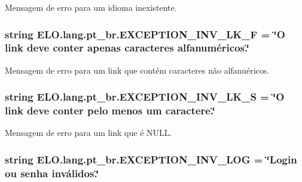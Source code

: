 Mensagem de erro para um idioma inexistente. 

\hypertarget{namespaceELO_1_1lang_1_1pt__br_ac80c2fa8182d4fcfd98a0aa7ee2fc242}{
\subsubsection[{E\-X\-C\-E\-P\-T\-I\-O\-N\-\_\-\-I\-N\-V\-\_\-\-L\-K\-\_\-\-F}]{\setlength{\rightskip}{0pt plus 5cm}string E\-L\-O.\-lang.\-pt\-\_\-br.\-E\-X\-C\-E\-P\-T\-I\-O\-N\-\_\-\-I\-N\-V\-\_\-\-L\-K\-\_\-\-F = \char`\"{}O link deve conter apenas caracteres alfanuméricos.\char`\"{}}}\label{d5/d70/namespaceELO_1_1lang_1_1pt__br_ac80c2fa8182d4fcfd98a0aa7ee2fc242}


Mensagem de erro para um link que contém caracteres não alfanuéricos. 

\hypertarget{namespaceELO_1_1lang_1_1pt__br_ab858646bddd566c0593f3787997a459c}{
\subsubsection[{E\-X\-C\-E\-P\-T\-I\-O\-N\-\_\-\-I\-N\-V\-\_\-\-L\-K\-\_\-\-S}]{\setlength{\rightskip}{0pt plus 5cm}string E\-L\-O.\-lang.\-pt\-\_\-br.\-E\-X\-C\-E\-P\-T\-I\-O\-N\-\_\-\-I\-N\-V\-\_\-\-L\-K\-\_\-\-S = \char`\"{}O link deve conter pelo menos um caractere.\char`\"{}}}\label{d5/d70/namespaceELO_1_1lang_1_1pt__br_ab858646bddd566c0593f3787997a459c}


Mensagem de erro para um link que é N\-U\-L\-L. 

\hypertarget{namespaceELO_1_1lang_1_1pt__br_a5b035d65858f7603a39f3e86362ef997}{
\subsubsection[{E\-X\-C\-E\-P\-T\-I\-O\-N\-\_\-\-I\-N\-V\-\_\-\-L\-O\-G}]{\setlength{\rightskip}{0pt plus 5cm}string E\-L\-O.\-lang.\-pt\-\_\-br.\-E\-X\-C\-E\-P\-T\-I\-O\-N\-\_\-\-I\-N\-V\-\_\-\-L\-O\-G = \char`\"{}Login ou senha inválidos.\char`\"{}}}\label{d5/d70/namespaceELO_1_1lang_1_1pt__br_a5b035d65858f7603a39f3e86362ef997}


